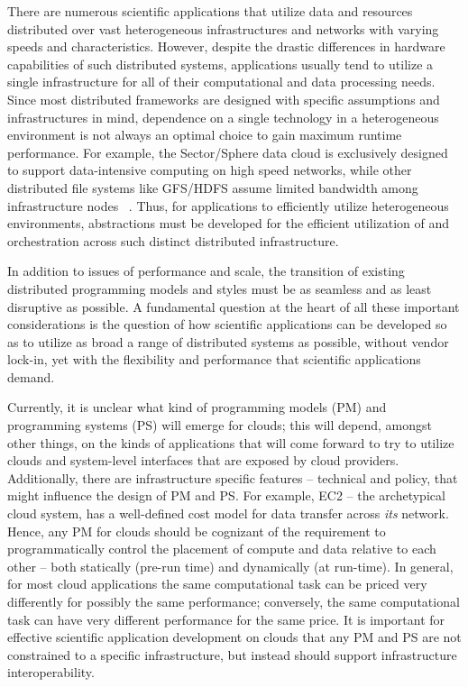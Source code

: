 \documentclass[3p,twocolumn]{elsarticle}
\begin{document}
There are numerous scientific applications that utilize data and
resources distributed over vast heterogeneous infrastructures and
networks with varying speeds and characteristics. However, despite the
drastic differences in hardware capabilities of such distributed
systems, applications usually tend to utilize a single infrastructure
for all of their computational and data processing needs. Since most
distributed frameworks are designed with specific assumptions and
infrastructures in mind, dependence on a single technology in a
heterogeneous environment is not always an optimal choice to gain
maximum runtime performance. For example, the Sector/Sphere data cloud
is exclusively designed to support data-intensive computing on high
speed networks, while other distributed file systems like GFS/HDFS
assume limited bandwidth among infrastructure nodes ~\cite{GFS, HDFS}. Thus,
for applications to efficiently utilize heterogeneous environments,
abstractions must be developed for the efficient utilization of and
orchestration across such distinct distributed infrastructure. 

In addition to issues of performance and scale, the transition of
existing distributed programming models and styles must be as
seamless and as least disruptive as possible.  A fundamental question
at the heart of all these important considerations is the question of
how scientific applications can be developed so as to utilize as broad
a range of distributed systems as possible, without vendor lock-in,
yet with the flexibility and performance that scientific applications
demand.

Currently, it is unclear what kind of programming models (PM) and
programming systems (PS) will emerge for clouds; this will depend,
amongst other things, on the kinds of applications that will come
forward to try to utilize clouds and system-level interfaces that are
exposed by cloud providers.  Additionally, there are infrastructure
specific features -- technical and policy, that might influence the
design of PM and PS. For example, EC2 -- the archetypical cloud system,
has a well-defined cost model for data transfer across {\it its}
network. Hence, any PM for clouds should be cognizant of the
requirement to programmatically control the placement of compute and
data relative to each other -- both statically (pre-run time) and
dynamically (at run-time).  In general, for most cloud applications
the same computational task can be priced very differently for
possibly the same performance; conversely, the same computational task
can have very different performance for the same price. It is
important for effective scientific application development on clouds
that any PM and PS are not constrained to a specific infrastructure,
but instead should support infrastructure interoperability.  
\end{document}
